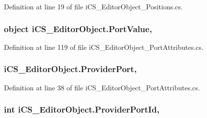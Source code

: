 Definition at line 19 of file i\+C\+S\+\_\+\+Editor\+Object\+\_\+\+Positions.\+cs.

\hypertarget{classi_c_s___editor_object_a8259185fe4a60e6da2e3db94e694b16c}{
\subsubsection[{Port\+Value}]{\setlength{\rightskip}{0pt plus 5cm}object i\+C\+S\+\_\+\+Editor\+Object.\+Port\+Value\hspace{0.3cm}{\ttfamily [get]}, {\ttfamily [set]}}}\label{classi_c_s___editor_object_a8259185fe4a60e6da2e3db94e694b16c}


Definition at line 119 of file i\+C\+S\+\_\+\+Editor\+Object\+\_\+\+Port\+Attributes.\+cs.

\hypertarget{classi_c_s___editor_object_a3d3b896d8808126cc25aa0b53174bee7}{
\subsubsection[{Provider\+Port}]{ i\+C\+S\+\_\+\+Editor\+Object.\+Provider\+Port\hspace{0.3cm}{\ttfamily [get]}, {\ttfamily [set]}}}\label{classi_c_s___editor_object_a3d3b896d8808126cc25aa0b53174bee7}


Definition at line 38 of file i\+C\+S\+\_\+\+Editor\+Object\+\_\+\+Port\+Attributes.\+cs.

\hypertarget{classi_c_s___editor_object_ac4fb7a1d259018da94a8c9989d85945b}{
\subsubsection[{Provider\+Port\+Id}]{\setlength{\rightskip}{0pt plus 5cm}int i\+C\+S\+\_\+\+Editor\+Object.\+Provider\+Port\+Id\hspace{0.3cm}{\ttfamily [get]}, {\ttfamily [set]}}}\label{classi_c_s___editor_object_ac4fb7a1d259018da94a8c9989d85945b}


